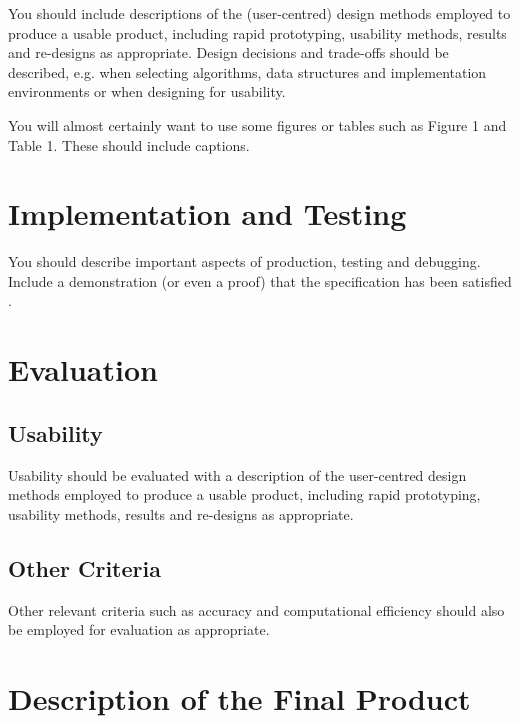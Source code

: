 \documentclass[twocolumn]{article}
\begin{document}
You should include descriptions of the (user-centred) design methods \cite{Eysenck} employed to produce a usable product, including rapid prototyping, usability methods, results and re-designs as appropriate. Design decisions and trade-offs should be described, e.g. when selecting algorithms, data structures and implementation environments or when designing for usability. 

You will almost certainly want to use some figures or tables such as Figure 1 and Table 1. These should include captions.


\section{Implementation and Testing}
\vspace{-1ex}

You should describe important aspects of production, testing and debugging. Include a demonstration (or even a proof) that the specification has been satisfied \cite{Houben}.


\section{Evaluation}
\vspace{-1ex}

\subsection{Usability}

Usability should be evaluated with a description of the user-centred design methods employed to produce a usable product, including rapid prototyping, usability methods, results and re-designs as appropriate.

\subsection{Other Criteria}

Other relevant criteria such as accuracy and computational efficiency should also be employed for evaluation as appropriate.


\section{Description of the Final Product}
\vspace{-1ex}
\end{document}
